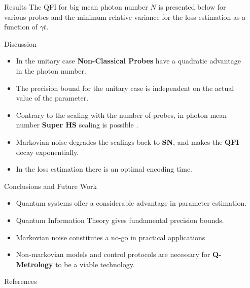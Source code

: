 \documentclass[final]{beamer}
\newlength{\sepwidth}
\newlength{\colwidth}
\newcommand{\separatorcolumn}{\begin{column}{\sepwidth}\end{column}}
\begin{document}
\begin{frame}[t]
\begin{columns}[t]
\begin{column}{\colwidth}
  \begin{exampleblock}{Results}
    The QFI for big mean photon number $N$ is presented below for various probes and  the minimum relative variance for the loss estimation as a function of $\gamma t$.
    
    \vspace{-0.1\linewidth}
    
    \vspace{-0.1\linewidth}
  \end{exampleblock}
\begin{alertblock}{Discussion}
  \begin{itemize}
    \item In the unitary case \textbf{Non-Classical Probes} have a quadratic advantage in the photon number.
    \item The precision bound for the unitary case is independent on the actual value of the parameter.
    \item Contrary to the scaling with the number of probes, in photon mean number  \textbf{Super HS} scaling is possible \cite{jiao_quantum_2023}.
    \item Markovian noise degrades the scalings back to \textbf{SN}, and makes the \textbf{QFI} decay exponentially.
    \item In the loss estimation there is an optimal encoding time.
  \end{itemize}
\end{alertblock}
\begin{alertblock}{Conclusions and Future Work}
  \begin{itemize}
    \item Quantum systems offer a considerable advantage in parameter estimation.
    \item Quantum Information Theory gives fundamental precision bounds.
    \item Markovian noise constitutes a no-go in practical applications
    \item Non-markovian models and control protocols are necessary for \textbf{Q-Metrology} to be a viable technology.
  \end{itemize}
\end{alertblock}

  \begin{block}{References}

\nocite{*}
    \small
    {
    \printbibliography{}}
  \end{block}


\end{column}
\separatorcolumn
\end{columns}
\end{frame}
\end{document}
